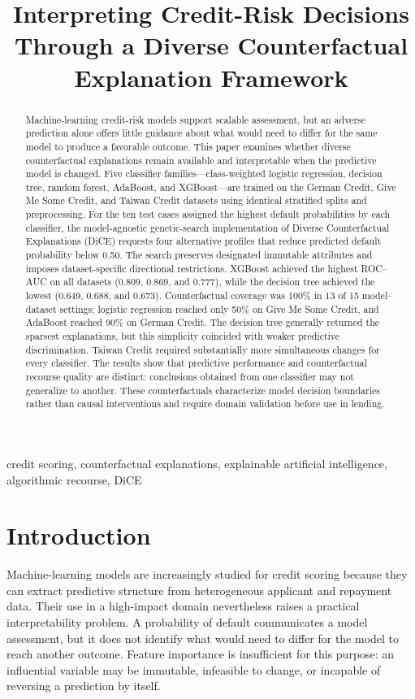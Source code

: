 \documentclass[conference]{IEEEtran}
\title{Interpreting Credit-Risk Decisions Through a Diverse Counterfactual Explanation Framework}
\author{\IEEEauthorblockN{Anonymous Author(s)}
\IEEEauthorblockA{Affiliation withheld for review}}
\begin{document}
\maketitle

\begin{abstract}
Machine-learning credit-risk models support scalable assessment, but an adverse prediction alone offers little guidance about what would need to differ for the same model to produce a favorable outcome. This paper examines whether diverse counterfactual explanations remain available and interpretable when the predictive model is changed. Five classifier families---class-weighted logistic regression, decision tree, random forest, AdaBoost, and XGBoost---are trained on the German Credit, Give Me Some Credit, and Taiwan Credit datasets using identical stratified splits and preprocessing. For the ten test cases assigned the highest default probabilities by each classifier, the model-agnostic genetic-search implementation of Diverse Counterfactual Explanations (DiCE) requests four alternative profiles that reduce predicted default probability below 0.50. The search preserves designated immutable attributes and imposes dataset-specific directional restrictions. XGBoost achieved the highest ROC--AUC on all datasets (0.809, 0.869, and 0.777), while the decision tree achieved the lowest (0.649, 0.688, and 0.673). Counterfactual coverage was 100\% in 13 of 15 model--dataset settings; logistic regression reached only 50\% on Give Me Some Credit, and AdaBoost reached 90\% on German Credit. The decision tree generally returned the sparsest explanations, but this simplicity coincided with weaker predictive discrimination. Taiwan Credit required substantially more simultaneous changes for every classifier. The results show that predictive performance and counterfactual recourse quality are distinct: conclusions obtained from one classifier may not generalize to another. These counterfactuals characterize model decision boundaries rather than causal interventions and require domain validation before use in lending.
\end{abstract}

\begin{IEEEkeywords}
credit scoring, counterfactual explanations, explainable artificial intelligence, algorithmic recourse, DiCE
\end{IEEEkeywords}

\section{Introduction}
Machine-learning models are increasingly studied for credit scoring because they can extract predictive structure from heterogeneous applicant and repayment data. Their use in a high-impact domain nevertheless raises a practical interpretability problem. A probability of default communicates a model assessment, but it does not identify what would need to differ for the model to reach another outcome. Feature importance is insufficient for this purpose: an influential variable may be immutable, infeasible to change, or incapable of reversing a prediction by itself.
\end{document}
